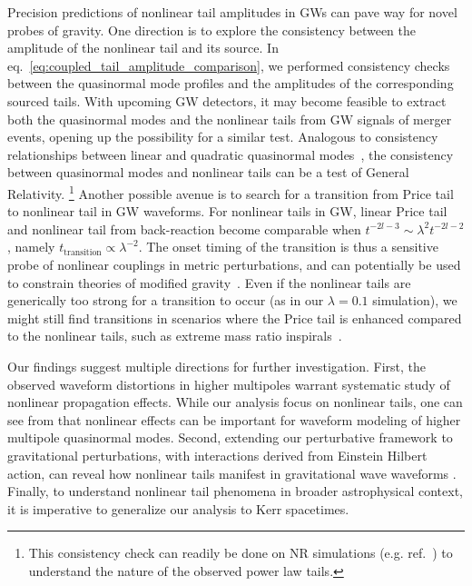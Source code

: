 Precision predictions of nonlinear tail amplitudes in GWs can pave way for novel probes of gravity.
One direction is to explore the consistency between the amplitude of the nonlinear tail and its source.
In eq.~\eqref{eq:coupled_tail_amplitude_comparison}, we performed consistency checks between the quasinormal mode profiles and the amplitudes of the corresponding sourced tails.
With upcoming GW detectors, it may become feasible to extract both the quasinormal modes and the nonlinear tails from GW signals of merger events, opening up the possibility for a similar test.
Analogous to consistency relationships between linear and quadratic quasinormal modes~\cite{Khera:2023oyf,Khera:2024yrk,Cheung:2022rbm,Mitman:2022qdl,Ma:2024qcv,Perrone:2023jzq}, the consistency between quasinormal modes and nonlinear tails can be a test of General Relativity.
\footnote{This consistency check can readily be done on NR simulations (e.g. ref.~\cite{DeAmicis:2024eoy,Ma:2024hzq}) to understand the nature of the observed power law tails.}
Another possible avenue is to search for a transition from Price tail to nonlinear tail in GW waveforms.
For nonlinear tails in GW, linear Price tail and nonlinear tail from back-reaction become comparable when $t^{-2l-3} \sim \lambda^2 t^{-2l-2}$, namely $t_{\mathrm{transition}} \propto \lambda^{-2}$.
The onset timing of the transition is thus a sensitive probe of nonlinear couplings in metric perturbations, and can potentially be used to constrain theories of modified gravity~\cite{Berti:2015itd}.
Even if the nonlinear tails are generically too strong for a transition to occur (as in our $\lambda = 0.1$ simulation), we might still find transitions in scenarios where the Price tail is enhanced compared to the nonlinear tails, such as extreme mass ratio inspirals~\cite{Islam:2024vro,DeAmicis:2024not}.


Our findings suggest multiple directions for further investigation.
First, the observed waveform distortions in higher multipoles warrant systematic study of nonlinear propagation effects.
While our analysis focus on nonlinear tails, one can see from  that nonlinear effects can be important for waveform modeling of higher multipole quasinormal modes.
Second, extending our perturbative framework to gravitational perturbations, with interactions derived from Einstein Hilbert action, can reveal how nonlinear tails manifest in gravitational wave waveforms \cite{Brizuela:2009qd}.
Finally, to understand nonlinear tail phenomena in broader astrophysical context, it is imperative to generalize our analysis to Kerr spacetimes.



